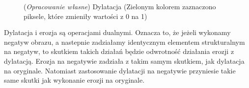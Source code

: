 \documentclass{article}
\begin{document}
        \begin{figure}[H]
            \centering
            \qquad
            \qquad
            \caption
            {
                (\textit{Opracowanie własne}) Dylatacja (Zielonym kolorem zaznaczono piksele, które zmieniły wartości z 0 na 1)
            }
            \label{dylatacja}
        \end{figure}

        {
            \Large
            \justifying
            \quad
            Dylatacja i erozja są operacjami dualnymi.
            Oznacza to, że jeżeli wykonamy negatyw obrazu, a nastepnie zadziałamy identycznym elementem strukturalnym na negatyw, to skutkiem takich działań będzie odwrotność działania erozji z dylatacją.
            Erozja na negatywie zadziała z takim samym skutkiem, jak dylatacja na oryginale.
            Natomiast zastosowanie dylatacji na negatywie przyniesie takie same skutki jak wykonanie erozji na oryginale.
        }

        \vspace{0.5cm}
\end{document}
